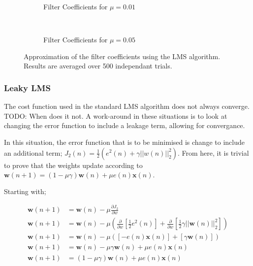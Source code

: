 \documentclass[main.tex]{subfiles}
\begin{document}
\begin{figure}[H]
	\centering
	\begin{subfigure}[b]{0.45\textwidth}
		\resizebox{\textwidth}{!}{}
		\caption{Filter Coefficients for $\mu = 0.01$}
	\end{subfigure}%
	~ %
	\begin{subfigure}[b]{0.45\textwidth}
		\resizebox{\textwidth}{!}{}
		\caption{Filter Coefficients for $\mu = 0.05$}
	\end{subfigure}
	\caption{Approximation of the filter coefficients using the LMS algorithm. Results are averaged over 500 independant trials.}
	\label{fig:animals}
\end{figure}










\subsubsection{Leaky LMS}

The cost function used in the standard LMS algorithm does not always converge. TODO: When does it not. A work-around in these situations is to look at changing the error function to include a leakage term, allowing for convergance. 

In this situation, the error function that is to be minimised is change to include an additional term; $J_2(n) = \frac{1}{2}(e^2(n) + \gamma||w(n)||^2_2)$. From here, it is trivial to prove that the weights update according to $\textbf{w}(n+1) = (1-\mu \gamma)\textbf{w}(n) + \mu e(n)\textbf{x}(n)$.

Starting with;


\begin{align*}
\textbf{w}(n+1) &= \textbf{w}(n) - \mu\frac{\partial J_2}{\partial w}\\
\textbf{w}(n+1) &= \textbf{w}(n) - \mu\left(\frac{\partial}{\partial w}\left[\frac{1}{2}e^2(n)\right] + \frac{\partial}{\partial w}\left[\frac{1}{2}\gamma||\textbf{w}(n)||^2_2\right]\right)\\
\textbf{w}(n+1) &= \textbf{w}(n) - \mu\left(\left[-e(n)\textbf{x}(n)\right] + \left[\gamma\textbf{w}(n)\right]\right)\\
\textbf{w}(n+1) &= \textbf{w}(n) - \mu\gamma\textbf{w}(n) + \mu e(n)\textbf{x}(n)\\
\textbf{w}(n+1) &= (1-\mu\gamma)\textbf{w}(n) + \mu e(n)\textbf{x}(n)
\end{align*}
\end{document}
